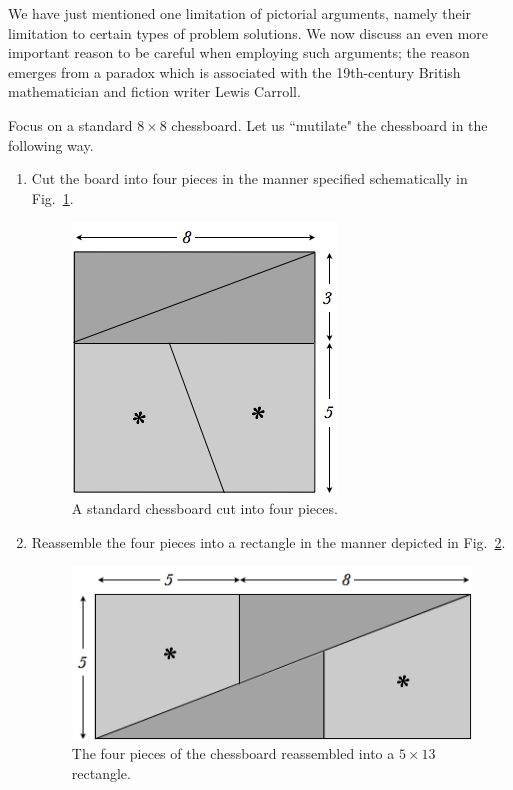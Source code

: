 We have just mentioned one limitation of pictorial arguments, namely their limitation to certain types of problem solutions.  We now discuss an even more important reason to be careful when employing such arguments; the reason emerges from a paradox which is associated with the 19th-century British mathematician and fiction writer Lewis Carroll.

\medskip

Focus on a standard $8 \times 8$ chessboard.  Let us ``mutilate" the chessboard in the following way.
\begin{enumerate}
\item
Cut the board into four pieces in the manner specified schematically in Fig.~\ref{fig:LewisCarollParadox1}.
\begin{figure}[ht]
\begin{center}
       \includegraphics[scale=0.475]{FiguresMaths/LewisCarollParadox1}
\caption{A standard chessboard cut into four pieces.}
       \label{fig:LewisCarollParadox1}
\end{center}
\end{figure}
\medskip\item
Reassemble the four pieces into a rectangle in the manner depicted in Fig.~\ref{fig:LewisCarollParadox2}. 
\begin{figure}[ht]
\begin{center}
       \includegraphics[scale=0.475]{FiguresMaths/LewisCarollParadox2}
\caption{The four pieces of the chessboard reassembled into a $5 \times13$ rectangle.}
       \label{fig:LewisCarollParadox2}
\end{center}
\end{figure}
\end{enumerate}

